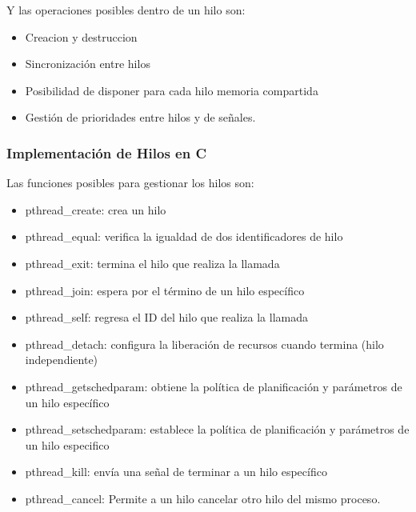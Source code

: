 Y las operaciones posibles dentro de un hilo son:

\begin{itemize} \item   Creacion y destruccion \item   Sincronización entre hilos \item   Posibilidad de disponer para cada hilo memoria compartida \item   Gestión de prioridades entre hilos y de señales. \end{itemize}

\subsubsection{Implementación de Hilos en C}\label{implementaciuxf3n-de-hilos-en-c}

Las funciones posibles para gestionar los hilos son:

\begin{itemize} \item   pthread\_create: crea un hilo \item   pthread\_equal: verifica la igualdad de dos identificadores de hilo \item   pthread\_exit: termina el hilo que realiza la llamada \item   pthread\_join: espera por el término de un hilo específico \item   pthread\_self: regresa el ID del hilo que realiza la llamada \item   pthread\_detach: configura la liberación de recursos cuando termina   (hilo independiente) \item   pthread\_getschedparam: obtiene la política de planificación y   parámetros de un hilo específico \item   pthread\_setschedparam: establece la política de planificación y   parámetros de un hilo especifico \item   pthread\_kill: envía una señal de terminar a un hilo específico \item   pthread\_cancel: Permite a un hilo cancelar otro hilo del mismo   proceso. \end{itemize}

